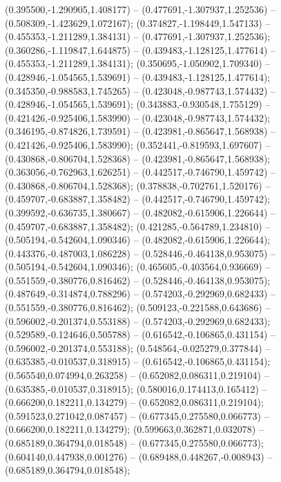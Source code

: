  (0.395500,-1.290905,1.408177) -- (0.477691,-1.307937,1.252536) -- (0.508309,-1.423629,1.072167);
 (0.374827,-1.198449,1.547133) -- (0.455353,-1.211289,1.384131) -- (0.477691,-1.307937,1.252536);
 (0.360286,-1.119847,1.644875) -- (0.439483,-1.128125,1.477614) -- (0.455353,-1.211289,1.384131);
 (0.350695,-1.050902,1.709340) -- (0.428946,-1.054565,1.539691) -- (0.439483,-1.128125,1.477614);
 (0.345350,-0.988583,1.745265) -- (0.423048,-0.987743,1.574432) -- (0.428946,-1.054565,1.539691);
 (0.343883,-0.930548,1.755129) -- (0.421426,-0.925406,1.583990) -- (0.423048,-0.987743,1.574432);
 (0.346195,-0.874826,1.739591) -- (0.423981,-0.865647,1.568938) -- (0.421426,-0.925406,1.583990);
 (0.352441,-0.819593,1.697607) -- (0.430868,-0.806704,1.528368) -- (0.423981,-0.865647,1.568938);
 (0.363056,-0.762963,1.626251) -- (0.442517,-0.746790,1.459742) -- (0.430868,-0.806704,1.528368);
 (0.378838,-0.702761,1.520176) -- (0.459707,-0.683887,1.358482) -- (0.442517,-0.746790,1.459742);
 (0.399592,-0.636735,1.380667) -- (0.482082,-0.615906,1.226644) -- (0.459707,-0.683887,1.358482);
 (0.421285,-0.564789,1.234810) -- (0.505194,-0.542604,1.090346) -- (0.482082,-0.615906,1.226644);
 (0.443376,-0.487003,1.086228) -- (0.528446,-0.464138,0.953075) -- (0.505194,-0.542604,1.090346);
 (0.465605,-0.403564,0.936669) -- (0.551559,-0.380776,0.816462) -- (0.528446,-0.464138,0.953075);
 (0.487649,-0.314874,0.788296) -- (0.574203,-0.292969,0.682433) -- (0.551559,-0.380776,0.816462);
 (0.509123,-0.221588,0.643686) -- (0.596002,-0.201374,0.553188) -- (0.574203,-0.292969,0.682433);
 (0.529589,-0.124646,0.505788) -- (0.616542,-0.106865,0.431154) -- (0.596002,-0.201374,0.553188);
 (0.548564,-0.025279,0.377844) -- (0.635385,-0.010537,0.318915) -- (0.616542,-0.106865,0.431154);
 (0.565540,0.074994,0.263258) -- (0.652082,0.086311,0.219104) -- (0.635385,-0.010537,0.318915);
 (0.580016,0.174413,0.165412) -- (0.666200,0.182211,0.134279) -- (0.652082,0.086311,0.219104);
 (0.591523,0.271042,0.087457) -- (0.677345,0.275580,0.066773) -- (0.666200,0.182211,0.134279);
 (0.599663,0.362871,0.032078) -- (0.685189,0.364794,0.018548) -- (0.677345,0.275580,0.066773);
 (0.604140,0.447938,0.001276) -- (0.689488,0.448267,-0.008943) -- (0.685189,0.364794,0.018548);
